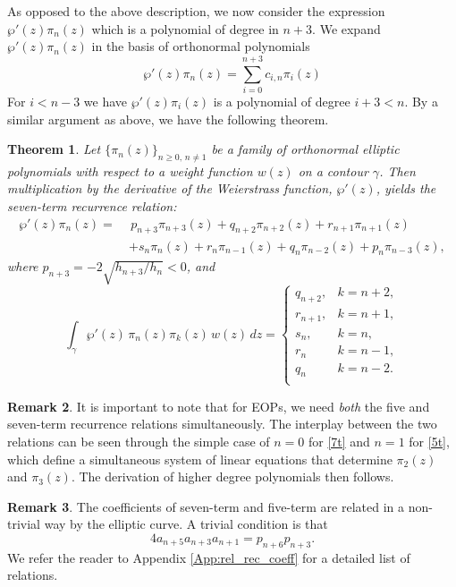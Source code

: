 \documentclass[11pt,a4paper]{article}
\newtheorem{theorem}{Theorem}
\theoremstyle{definition}
\newtheorem{remark}[theorem]{Remark}
\numberwithin{equation}{section}
\numberwithin{theorem}{section}
\newcommand{\myrmk}[2]{\begin{quote}\fbox{\begin{minipage}{\linewidth}\small \noindent{\color{red}\bf #2:} #1{\color{red}}\end{minipage}}\end{quote}}
\newcommand{\rmkS}[1]{\myrmk{#1}{SL}}
\begin{document}
As opposed to the above description, we now consider the expression $\wp'(z)\pi_{n}(z)$ which is a polynomial of degree in $n+3$. We expand $\wp'(z)\pi_{n}(z)$ in the basis of orthonormal polynomials
\begin{equation}\label{expansion2}
     \wp'(z)\pi_{n}(z)=\sum_{i=0}^{n+3}c_{i,n}\pi_{i}(z) 
\end{equation}
For $i<n-3$ we have $\wp'(z)\pi_{i}(z)$ is a polynomial of degree $i+3<n$. By a similar argument as above, we have the following theorem.
\begin{theorem}\label{thm:sevent}
Let \( \{\pi_n(z)\}_{n \geq 0,\, n \neq 1} \) be a family of orthonormal elliptic polynomials with respect to a weight function \( w(z) \) on a contour \( \gamma \). Then multiplication by the derivative of the Weierstrass function, \( \wp'(z) \), yields the seven-term recurrence relation:
\begin{equation}\label{eq:7term}
\begin{aligned}
\wp'(z)\pi_n(z) =\ &\, p_{n+3}\pi_{n+3}(z) + q_{n+2}\pi_{n+2}(z) + r_{n+1}\pi_{n+1}(z) \\
&+ s_n\pi_n(z) + r_n\pi_{n-1}(z) + q_n\pi_{n-2}(z) + p_n\pi_{n-3}(z),
\end{aligned}
\end{equation}
where \( p_{n+3} = -2\sqrt{h_{n+3}/h_n} < 0 \), and
\[
\int_{\gamma} \wp'(z)\, \pi_n(z)\pi_k(z)\, w(z)\, dz =
\begin{cases}
q_{n+2}, & k = n+2, \\
r_{n+1}, & k = n+1, \\
s_n,     & k = n,\\
r_n      & k=n-1,\\
q_n &k=n-2.\\
\end{cases}
\]
\end{theorem}
\begin{remark}
    It is important to note that for EOPs, we need {\it both} the five and seven-term recurrence relations simultaneously. The interplay between the two relations can be seen through the simple case of $n=0$ for \eqref{7t} and $n=1$ for \eqref{5t}, which define a simultaneous system of linear equations that determine $\pi_{2}(z)$ and $\pi_3(z)$. The derivation of higher degree polynomials then follows.
\end{remark}
\begin{remark}
    The coefficients of seven-term and five-term are related in a non-trivial way by the elliptic curve. 
    A trivial condition is that 
    \begin{equation}
       4 a_{n+5}a_{n+3}a_{n+1}=p_{n+6}p_{n+3}.
    \end{equation}
    We refer the reader to Appendix \ref{App:rel_rec_coeff} for a detailed list of relations.
\end{remark}
\end{document}
